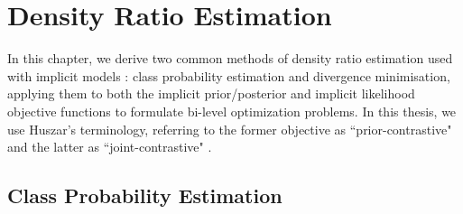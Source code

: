 \documentclass[honours,12pt]{unswthesis}
\numberwithin{equation}{section}
\theoremstyle{definition}
\begin{document}
\chapter{Density Ratio Estimation}
In this chapter, we derive two common methods of density ratio estimation used with implicit models \citep{sugiyama, mohamed}: class probability estimation and divergence minimisation, applying them to both the implicit prior/posterior and implicit likelihood objective functions to formulate bi-level optimization problems. In this thesis, we use Huszar's terminology, referring to the former objective as ``prior-contrastive" and the latter as ``joint-contrastive" \citep{huszar}.
\section{Class Probability Estimation}
\end{document}
